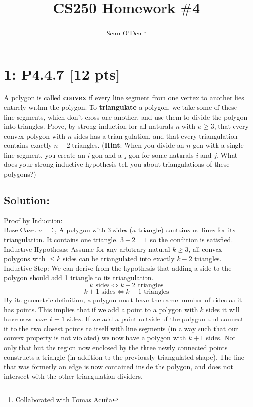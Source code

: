 \documentclass[12pt]{article}
\title{CS250 Homework $\#$4}
\author{Sean O'Dea \footnote{Collaborated with Tomas Acu\~na}}
\begin{document}
\maketitle

\section*{\textbf{1: P4.4.7} [12 pts]}
A polygon is called \textbf{convex} if every line segment from one vertex to another lies entirely within the polygon. To \textbf{triangulate} a polygon, we take some of these line segments, which don’t cross one another, and use them to divide the polygon into triangles. Prove, by strong induction for all naturals $n$ with $n \geq 3$, that every convex polygon with $n$ sides has a trian-gulation, and that every triangulation contains exactly $n - 2$ triangles. (\textbf{Hint}: When you divide an $n$-gon with a single line segment, you create an $i$-gon and a $j$-gon for some naturals $i$ and $j$. What does your strong inductive hypothesis tell you about triangulations of these polygons?)


\subsection*{\textbf{Solution:}}
Proof by Induction:\\

Base Case:
$n = 3$; A polygon with 3 sides (a triangle) contains no lines for its triangulation. It contains one triangle. $3-2=1$ so the condition is satisfied.\\

Inductive Hypothesis: Assume for any arbitrary natural $k \geq 3$, all convex polygons with $\leq k$ sides can be triangulated into exactly $k-2$ triangles.\\

Inductive Step: We can derive from the hypothesis that adding a side to the polygon should add 1 triangle to its triangulation.
\[ k \text{ sides} \iff k-2 \text{ triangles} \]
\[ k+1 \text{ sides} \iff k-1 \text{ triangles} \]
By its geometric definition, a polygon must have the same number of sides as it has points. This implies that if we add a point to a polygon with $k$ sides it will have now have $k+1$ sides.
If we add a point outside of the polygon and connect it to the two closest points to itself with line segments (in a way such that our convex property is not violated) we now have a polygon with $k+1$ sides. Not only that but the region now enclosed by the three newly connected points constructs a triangle (in addition to the previously triangulated shape). The line that was formerly an edge is now contained inside the polygon, and does not intersect with the other triangulation dividers.
\end{document}
